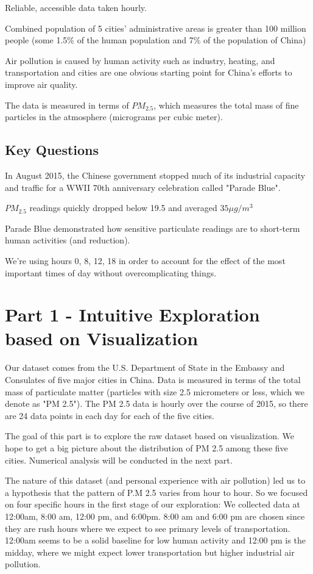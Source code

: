 \documentclass[11pt]{article} %
\begin{document}
Reliable, accessible data taken hourly.

Combined population of 5 cities' administrative areas is greater than
100 million people (some 1.5\% of the human population 
and 7\% of the population of China)

Air pollution is caused by human activity
such as industry, heating, and transportation
and cities are one obvious starting point
for China's efforts to improve air quality.

The data is measured in terms of \(PM_{2.5}\), which measures the 
total mass of fine particles in the atmosphere (micrograms
per cubic meter).

\subsection{Key Questions}

In August 2015, the Chinese government stopped much of its
industrial capacity and traffic for a 
WWII 70th anniversary celebration called "Parade Blue"\cite{Boren15}.

\(PM_{2.5}\) readings quickly dropped below 19.5 and averaged \(35 \mu g/m^3\)



Parade Blue demonstrated how sensitive particulate readings
are to short-term human activities (and reduction).

We're using hours 0, 8, 12, 18 in order to account
for the effect of the most important times of day
without overcomplicating things.

\section{Part 1 - Intuitive Exploration based on Visualization}



	Our dataset comes from the U.S. Department of State in the Embassy and Consulates of five major cities in China. Data is measured in terms of the total mass of particulate matter (particles with size 2.5 micrometers or less, which we denote as "PM 2.5"). The PM 2.5 data is hourly over the course of 2015, so there are 24 data points in each day for each of the five cities.

	The goal of this part is to explore the raw dataset based on visualization. We hope to get a big picture about the distribution of PM 2.5 among these five cities. Numerical analysis will be conducted in the next part.

	The nature of this dataset (and personal experience with air pollution) led us to a hypothesis that the pattern of P.M 2.5 varies from hour to hour. So we focused on four specific hours in the first stage of our exploration: We collected data at 12:00am, 8:00 am, 12:00 pm, and 6:00pm. 8:00 am and 6:00 pm are chosen since they are rush hours where we expect to see primary levels of transportation. 12:00am seems to be a solid baseline for low human activity and 12:00 pm is the midday, where we might expect lower transportation but higher industrial air pollution.
\end{document}
